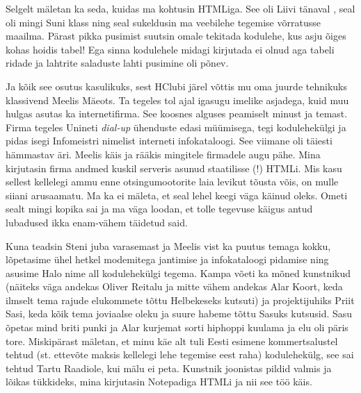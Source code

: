 Selgelt mäletan ka seda, kuidas ma kohtusin HTMLiga. See oli Liivi 
tänaval , seal oli mingi Suni 
klass ning seal sukeldusin ma veebilehe tegemise 
võrratusse maailma. Pärast pikka pusimist suutsin omale tekitada kodulehe, kus 
asju õiges kohas hoidis tabel! Ega sinna kodulehele midagi kirjutada ei olnud 
aga tabeli ridade ja lahtrite saladuste lahti pusimine oli põnev.

Ja kõik see osutus kasulikuks, sest HClubi järel võttis mu oma juurde tehnikuks 
klassivend Meelis Mäeots. Ta tegeles tol ajal 
igasugu imelike asjadega, kuid muu hulgas asutas ka internetifirma. See koosnes 
alguses peamiselt minust ja temast. Firma tegeles Unineti 
\emph{dial-up} ühenduste edasi müümisega, tegi kodulehekülgi ja pidas isegi 
Infomeistri nimelist interneti infokataloogi. See viimane oli täiesti hämmastav 
äri. Meelis käis ja rääkis mingitele firmadele augu pähe. Mina kirjutasin firma 
andmed kuskil serveris asunud staatilisse (!) HTMLi. Mis kasu sellest kellelegi 
ammu enne otsingumootorite laia levikut tõusta võis, on mulle siiani 
arusaamatu. Ma ka ei mäleta, et seal lehel keegi väga käinud oleks. Ometi sealt 
mingi kopika sai ja ma väga loodan, et tolle tegevuse käigus antud lubadused 
ikka enam-vähem täidetud said. 

Kuna teadsin Steni juba varasemast ja Meelis vist ka puutus temaga kokku, 
lõpetasime ühel hetkel modemitega jantimise ja infokataloogi pidamise ning 
asusime Halo nime all kodulehekülgi tegema. Kampa 
võeti ka mõned kunstnikud (näiteks väga andekas Oliver 
Reitalu ja mitte vähem andekas Alar 
Koort, keda ilmselt tema rajude elukommete tõttu 
Helbekeseks kutsuti) ja projektijuhiks Priit Sasi, keda 
kõik tema joviaalse oleku ja suure habeme tõttu Sasuks kutsusid. Sasu õpetas 
mind briti punki ja Alar kurjemat sorti hiphoppi kuulama ja elu oli päris tore. 
Miskipärast mäletan, et minu käe alt tuli Eesti esimene kommertsalustel tehtud 
(st. ettevõte maksis kellelegi lehe tegemise eest raha) kodulehekülg, see sai 
tehtud Tartu Raadiole, kui mälu ei peta. Kunstnik joonistas 
pildid valmis ja lõikas tükkideks, mina kirjutasin Notepadiga HTMLi ja nii see 
töö käis. 

